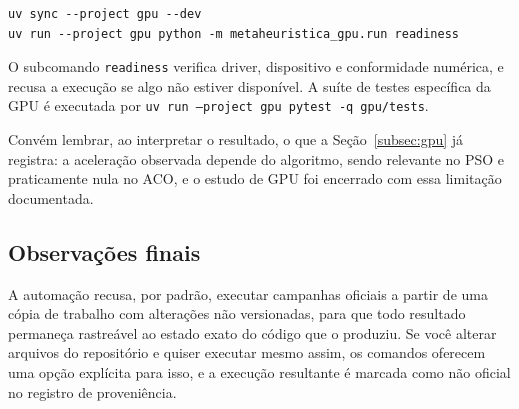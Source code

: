\documentclass[12pt,a4paper]{article}
\begin{document}
\begin{verbatim}
uv sync --project gpu --dev
uv run --project gpu python -m metaheuristica_gpu.run readiness
\end{verbatim}

O subcomando \texttt{readiness} verifica driver, dispositivo e
conformidade numérica, e recusa a execução se algo não estiver
disponível. A suíte de testes específica da GPU é executada por
\texttt{uv run --project gpu pytest -q gpu/tests}.

Convém lembrar, ao interpretar o resultado, o que a Seção~\ref{subsec:gpu} já
registra: a aceleração observada depende do algoritmo, sendo relevante no
PSO e praticamente nula no ACO, e o estudo de GPU foi encerrado com essa
limitação documentada.

\subsection{Observações finais}

A automação recusa, por padrão, executar campanhas oficiais a partir de
uma cópia de trabalho com alterações não versionadas, para que todo
resultado permaneça rastreável ao estado exato do código que o produziu.
Se você alterar arquivos do repositório e quiser executar mesmo assim, os
comandos oferecem uma opção explícita para isso, e a execução resultante
é marcada como não oficial no registro de proveniência.
\end{document}
